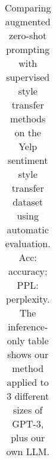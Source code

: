 \begin{table}[t]
\begin{tabular}{l r r r}
        \bottomrule
        \end{tabular}
\caption{
Comparing augmented zero-shot prompting with supervised style transfer methods on the Yelp sentiment style transfer dataset using automatic evaluation.
Acc: accuracy; PPL: perplexity.  The inference-only table shows our method applied to 3 different sizes of GPT-3, plus our own LLM. 
}
        \label{tab:summary_table}
\end{table}